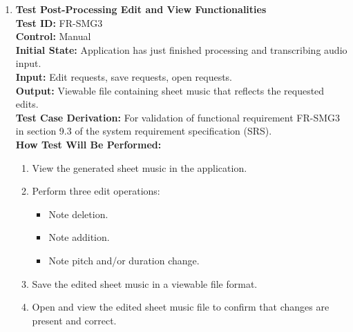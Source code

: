 \documentclass[12pt, titlepage]{article}
\begin{document}
\begin{enumerate}
  \item \textbf{Test Post-Processing Edit and View Functionalities} \\
    \newline
    \textbf{Test ID:} FR-SMG3 \\
    \textbf{Control:} Manual \\
    \textbf{Initial State:} Application has just finished processing and transcribing audio input. \\
    \textbf{Input:} Edit requests, save requests, open requests. \\
    \textbf{Output:} Viewable file containing sheet music that reflects the requested edits. \\
    \textbf{Test Case Derivation:} For validation of functional requirement FR-SMG3 in section 9.3 of the system requirement specification (SRS). \\
    \textbf{How Test Will Be Performed:}
    \begin{enumerate}
        \item View the generated sheet music in the application.
        \item Perform three edit operations:
        \begin{itemize}
            \item Note deletion.
            \item Note addition.
            \item Note pitch and/or duration change.
        \end{itemize}
        \item Save the edited sheet music in a viewable file format.
        \item Open and view the edited sheet music file to confirm that changes are present and correct.
    \end{enumerate}
  \end{enumerate}
\end{document}

